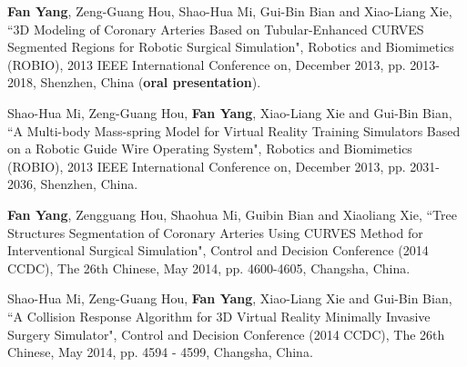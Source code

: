 
\begin{publications}{99}

\item \textbf{Fan Yang}, Zeng-Guang Hou, Shao-Hua Mi, Gui-Bin Bian and Xiao-Liang Xie, ``3D Modeling of Coronary Arteries Based on Tubular-Enhanced CURVES Segmented Regions for Robotic Surgical Simulation", Robotics and Biomimetics (ROBIO), 2013 IEEE International Conference on, December 2013, pp. 2013-2018, Shenzhen, China (\textbf{oral presentation}).%

\item Shao-Hua Mi, Zeng-Guang Hou, \textbf{Fan Yang}, Xiao-Liang Xie and Gui-Bin Bian, ``A Multi-body Mass-spring Model for Virtual Reality Training Simulators Based on a Robotic Guide Wire Operating System", Robotics and Biomimetics (ROBIO), 2013 IEEE International Conference on, December 2013, pp. 2031-2036, Shenzhen, China.%

\item \textbf{Fan Yang}, Zengguang Hou, Shaohua Mi, Guibin Bian and Xiaoliang Xie, ``Tree Structures Segmentation of Coronary Arteries Using CURVES Method for Interventional Surgical Simulation", Control and Decision Conference (2014 CCDC), The 26th Chinese, May 2014, pp. 4600-4605, Changsha, China.%

\item Shao-Hua Mi, Zeng-Guang Hou, \textbf{Fan Yang}, Xiao-Liang Xie and Gui-Bin Bian, ``A Collision Response Algorithm for 3D Virtual Reality Minimally Invasive Surgery Simulator", Control and Decision Conference (2014 CCDC), The 26th Chinese, May 2014, pp. 4594 - 4599, Changsha, China.%

\end{publications}
